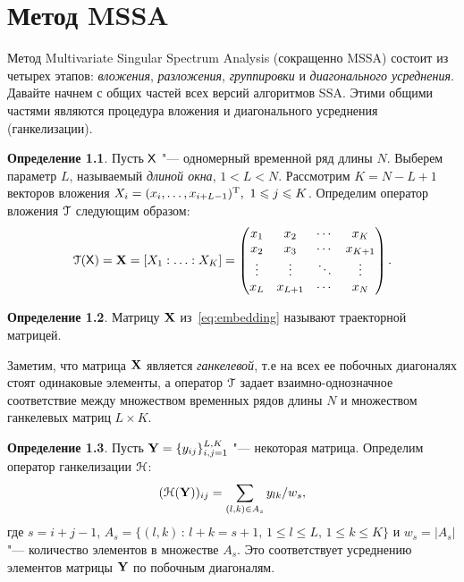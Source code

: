 \documentclass[specialist,
substylefile = spbu_report.rtx,
subf,href,colorlinks=true, 12pt]{disser}
\theoremstyle{definition}
\newtheorem{definition}{Определение}
\begin{document}


\chapter{Метод MSSA}
Метод Multivariate Singular Spectrum Analysis (сокращенно MSSA) состоит из четырех этапов: \emph{вложения}, \emph{разложения}, \emph{группировки} и \emph{диагонального усреднения}.
Давайте начнем с общих частей всех версий алгоритмов SSA. Этими общими частями являются процедура вложения и диагонального усреднения (ганкелизации).
\begin{definition}
	Пусть $\mathsf{X}$ "--- одномерный временной ряд длины $N$. Выберем параметр $L$, называемый \emph{длиной окна}, $1<L<N$. Рассмотрим $K=N-L+1$ векторов вложения $X_i=(x_{i},\ldots, x_{i+L-1})^{\mathrm{T}},\ 1\leqslant j \leqslant K$. Определим оператор вложения $\EuScript{T}$ следующим образом:
	\begin{equation}\label{eq:embedding}
		\EuScript{T}(\mathsf{X})=\mathbf{X}=[X_1:\ldots:X_K]=
		\begin{pmatrix}
			x_1    & x_2     & \cdots & x_K     \\
			x_2    & x_3     & \cdots & x_{K+1} \\
			\vdots & \vdots  & \ddots & \vdots  \\
			x_L    & x_{L+1} & \cdots & x_N
		\end{pmatrix}.
	\end{equation}
\end{definition}
\begin{definition}
	Матрицу $\mathbf{X}$ из~\eqref{eq:embedding} называют траекторной матрицей.
\end{definition}\noindent
Заметим, что матрица $\mathbf{X}$ является \emph{ганкелевой}, т.е на всех ее побочных диагоналях стоят одинаковые элементы, а оператор $\EuScript{T}$ задает взаимно-однозначное соответствие между множеством временных рядов длины $N$ и множеством ганкелевых матриц $L\times K$.
\begin{definition}
	Пусть $\mathbf{Y}=\{y_{ij}\}_{i,j=1}^{L,K}$ "--- некоторая матрица. Определим оператор ганкелизации $\EuScript{H}$:
	\begin{equation}\label{eq:averaging}
		(\EuScript{H}(\mathbf{Y}))_{ij}=\sum_{(l,k)\in A_s}y_{lk}/w_s,
	\end{equation}
	где $s=i+j-1$, $A_s=\{(l,k)\, :\, l+k=s+1,\, 1\leqslant l\leqslant L,\, 1\leqslant k\leqslant K\}$ и $w_s=|A_s|$ "--- количество элементов в множестве $A_s$. Это соответствует
	усреднению элементов матрицы $\mathbf{Y}$ по побочным диагоналям.
\end{definition}
\end{document}
